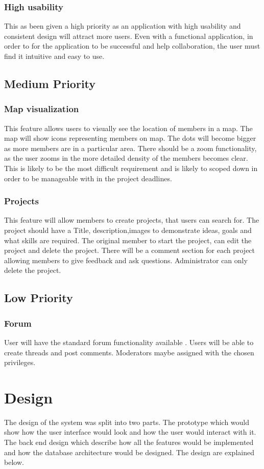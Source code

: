 \documentclass[a4paper,oneside,11pt]{report}
\begin{document}
\subsubsection{High usability} 
This as been given a high priority as an application with high usability and consistent design will attract more users. Even with a functional application, in order to for the application to be successful and help collaboration, the user must find it intuitive and easy to use.
\subsection{Medium Priority}
\subsubsection{Map visualization}
This feature allows users to visually see the location of members in a map. The map will show icons representing members on map. The dots will become bigger as more members are in a particular area. There should be a zoom functionality, as the user zooms in the more detailed density of the members becomes clear. This is likely to be the most difficult requirement and is likely to scoped down in order to be manageable with in the project deadlines.
\subsubsection{Projects}
This feature will allow members to create projects, that users can search for. The project should have a Title, description,images to demonstrate ideas, goals and what skills are required. The original member to start the project, can edit the project and delete the project. There will be a comment section for each project allowing members to give feedback and ask questions. Administrator can only delete the project.
\subsection{Low Priority}
\subsubsection{Forum}
User will have the standard forum functionality available . Users will be able to create threads and post comments. Moderators maybe assigned with the chosen privileges. 
\section{Design}
The design of the system was split into two parts. The prototype which would show how the user interface would look and how the user would interact with it. The back end design which describe how all the features would be implemented and how the database architecture would be designed. The design are explained below.
\end{document}
